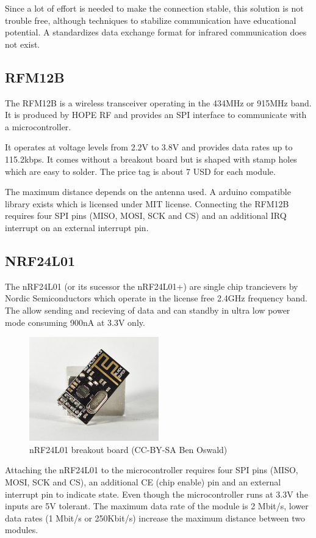 Since a lot of effort is needed to make the connection stable, this solution is not trouble free, although techniques to stabilize communication have educational potential. A standardizes data exchange format for infrared communication does not exist.

\subsection{RFM12B}
The RFM12B is a wireless transceiver operating in the 434MHz or 915MHz band. It is produced by HOPE RF and provides an SPI interface to communicate with a microcontroller. 

It operates at voltage levels from 2.2V to 3.8V and provides data rates up to 115.2kbps. It comes without a breakout board but is shaped with stamp holes which are easy to solder. The price tag is about 7 USD for each module.

The maximum distance depends on the antenna used. A arduino compatible library exists which is licensed under MIT license. Connecting the RFM12B requires four SPI pins (MISO, MOSI, SCK and CS) and an additional IRQ interrupt on an external interrupt pin.
\subsection{NRF24L01}
The nRF24L01 (or its sucessor the nRF24L01+) are single chip trancievers by Nordic Semiconductors which operate in the license free 2.4GHz frequency band. The allow sending and recieving of data and can standby in ultra low power mode consuming 900nA at 3.3V only.

\begin{figure}[H]
  \centering
  \includegraphics[width=0.5\textwidth]{images/30_nrf24l01.jpg}
  \caption{nRF24L01 breakout board (CC-BY-SA Ben Oswald)}
\end{figure}

Attaching the nRF24L01 to the microcontroller requires four SPI pins (MISO, MOSI, SCK and CS), an additional CE (chip enable) pin and an external interrupt pin to indicate state. Even though the microcontroller runs at 3.3V the inputs are 5V tolerant. The maximum data rate of the module is 2 Mbit/s, lower data rates (1 Mbit/s or 250Kbit/s) increase the maximum distance between two modules.

